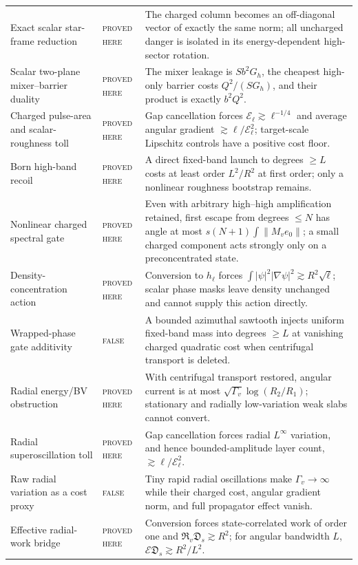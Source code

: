 \documentclass[11pt]{article}
\newcommand{\statusproved}{\textcolor{proved}{\textsc{proved here}}}
\newcommand{\statusfailed}{\textcolor{failed}{\textsc{false}}}
\theoremstyle{definition}
\theoremstyle{remark}
\begin{document}
\begin{longtable}{>{\raggedright\arraybackslash}p{}>{\raggedright\arraybackslash}p{}>{\raggedright\arraybackslash}p{}}
Exact scalar star-frame reduction & \statusproved & The charged column becomes an off-diagonal vector of exactly the same norm; all uncharged danger is isolated in its energy-dependent high-sector rotation. \\
Scalar two-plane mixer--barrier duality & \statusproved & The mixer leakage is $S b^2G_h$, the cheapest high-only barrier costs $Q^2/(S G_h)$, and their product is exactly $b^2Q^2$. \\
Charged pulse-area and scalar-roughness toll & \statusproved & Gap cancellation forces $\mathcal E_\ell\gtrsim\ell^{-1/4}$ and average angular gradient $\gtrsim\ell/\mathcal E_\ell^2$; target-scale Lipschitz controls have a positive cost floor. \\
Born high-band recoil & \statusproved & A direct fixed-band launch to degrees $\geq L$ costs at least order $L^2/R^2$ at first order; only a nonlinear roughness bootstrap remains. \\
Nonlinear charged spectral gate & \statusproved & Even with arbitrary high--high amplification retained, first escape from degrees $\leq N$ has angle at most $s(N+1)\int\|M_ve_0\|$; a small charged component acts strongly only on a preconcentrated state. \\
Density-concentration action & \statusproved & Conversion to $h_\ell$ forces $\int|\psi|^2|\nabla\psi|^2\gtrsim R^2\sqrt\ell$; scalar phase masks leave density unchanged and cannot supply this action directly. \\
Wrapped-phase gate additivity & \statusfailed & A bounded azimuthal sawtooth injects uniform fixed-band mass into degrees $\geq L$ at vanishing charged quadratic cost when centrifugal transport is deleted. \\
Radial energy/BV obstruction & \statusproved & With centrifugal transport restored, angular current is at most $\sqrt{\Gamma_v}\log(R_2/R_1)$; stationary and radially low-variation weak slabs cannot convert. \\
Radial superoscillation toll & \statusproved & Gap cancellation forces radial $L^\infty$ variation, and hence bounded-amplitude layer count, $\gtrsim\ell/\mathcal E_\ell^2$. \\
Raw radial variation as a cost proxy & \statusfailed & Tiny rapid radial oscillations make $\Gamma_v\to\infty$ while their charged cost, angular gradient norm, and full propagator effect vanish. \\
Effective radial-work bridge & \statusproved & Conversion forces state-correlated work of order one and $\mathfrak R_v\mathfrak D_s\gtrsim R^2$; for angular bandwidth $L$, $\mathcal E\mathfrak D_s\gtrsim R^2/L^2$. \\

\end{longtable}
\end{document}
